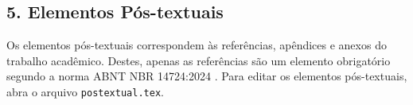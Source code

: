 \begin{apendicesenv}
\section*{5. Elementos Pós-textuais}

Os elementos pós-textuais correspondem às referências, apêndices e anexos do trabalho acadêmico. Destes, apenas as referências são um elemento obrigatório segundo a norma ABNT NBR 14724:2024 \cite{nbr14724}.  Para editar os elementos pós-textuais, abra o arquivo \verb|postextual.tex|.


\end{apendicesenv}